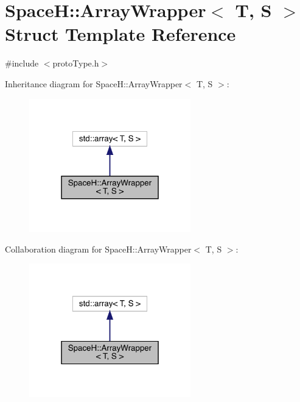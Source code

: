 \hypertarget{struct_space_h_1_1_array_wrapper}{}\section{SpaceH\+:\+:Array\+Wrapper$<$ T, S $>$ Struct Template Reference}
\label{struct_space_h_1_1_array_wrapper}


{\ttfamily \#include $<$proto\+Type.\+h$>$}



Inheritance diagram for SpaceH\+:\+:Array\+Wrapper$<$ T, S $>$\+:\nopagebreak
\begin{figure}[H]
\begin{center}
\leavevmode
\includegraphics[width=199pt]{struct_space_h_1_1_array_wrapper__inherit__graph}
\end{center}
\end{figure}


Collaboration diagram for SpaceH\+:\+:Array\+Wrapper$<$ T, S $>$\+:\nopagebreak
\begin{figure}[H]
\begin{center}
\leavevmode
\includegraphics[width=199pt]{struct_space_h_1_1_array_wrapper__coll__graph}
\end{center}
\end{figure}

